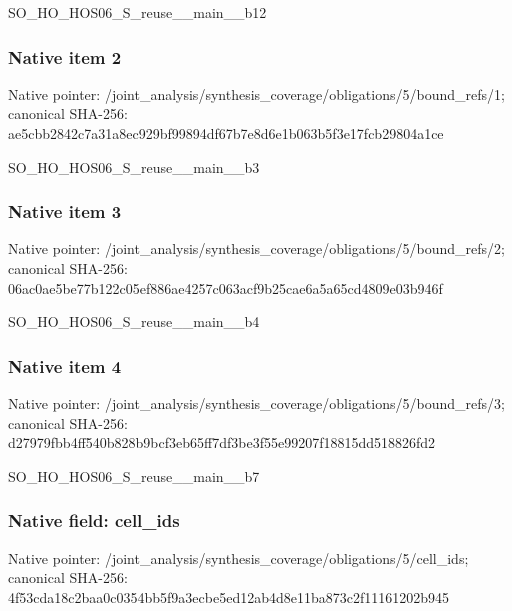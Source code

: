 \documentclass[10pt,a4paper]{article}
\begin{document}
\begingroup\raggedright\sloppy SO\_\allowbreak{}HO\_\allowbreak{}HOS06\_\allowbreak{}S\_\allowbreak{}reuse\_\allowbreak{}\_\allowbreak{}main\_\allowbreak{}\_\allowbreak{}b12\par\endgroup

\subsubsection{Native item 2}
Native pointer: /joint\_\allowbreak{}analysis/synthesis\_\allowbreak{}coverage/obligations/5/bound\_\allowbreak{}refs/1; canonical SHA-256: ae5cbb2842c7a31a8ec929bf99894df67b7e8d6e1b063b5f3e17fcb29804a1ce

\begingroup\raggedright\sloppy SO\_\allowbreak{}HO\_\allowbreak{}HOS06\_\allowbreak{}S\_\allowbreak{}reuse\_\allowbreak{}\_\allowbreak{}main\_\allowbreak{}\_\allowbreak{}b3\par\endgroup

\subsubsection{Native item 3}
Native pointer: /joint\_\allowbreak{}analysis/synthesis\_\allowbreak{}coverage/obligations/5/bound\_\allowbreak{}refs/2; canonical SHA-256: 06ac0ae5be77b122c05ef886ae4257c063acf9b25cae6a5a65cd4809e03b946f

\begingroup\raggedright\sloppy SO\_\allowbreak{}HO\_\allowbreak{}HOS06\_\allowbreak{}S\_\allowbreak{}reuse\_\allowbreak{}\_\allowbreak{}main\_\allowbreak{}\_\allowbreak{}b4\par\endgroup

\subsubsection{Native item 4}
Native pointer: /joint\_\allowbreak{}analysis/synthesis\_\allowbreak{}coverage/obligations/5/bound\_\allowbreak{}refs/3; canonical SHA-256: d27979fbb4ff540b828b9bcf3eb65ff7df3be3f55e99207f18815dd518826fd2

\begingroup\raggedright\sloppy SO\_\allowbreak{}HO\_\allowbreak{}HOS06\_\allowbreak{}S\_\allowbreak{}reuse\_\allowbreak{}\_\allowbreak{}main\_\allowbreak{}\_\allowbreak{}b7\par\endgroup

\subsubsection{Native field: cell\_\allowbreak{}ids}
Native pointer: /joint\_\allowbreak{}analysis/synthesis\_\allowbreak{}coverage/obligations/5/cell\_\allowbreak{}ids; canonical SHA-256: 4f53cda18c2baa0c0354bb5f9a3ecbe5ed12ab4d8e11ba873c2f11161202b945
\end{document}
